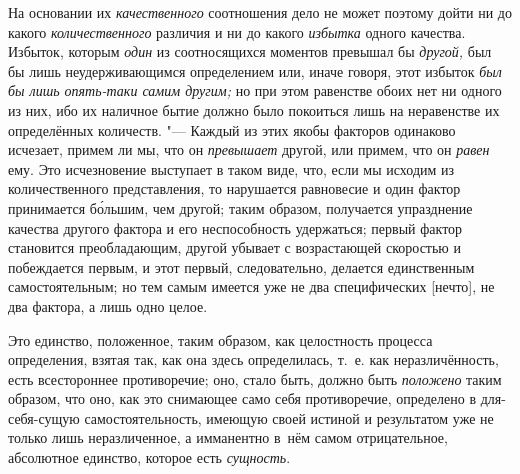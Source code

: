 На основании их {\em качественного} соотношения дело не может поэтому дойти ни
до какого {\em количественного} различия и ни до какого {\em избытка} одного
качества. Избыток, которым {\em один} из соотносящихся моментов превышал бы
{\em другой,} был бы лишь неудерживающимся определением или, иначе говоря, этот
избыток {\em был бы лишь опять-таки самим другим;} но при этом равенстве обоих
нет ни одного из них, ибо их наличное бытие должно было покоиться лишь на
неравенстве их определённых количеств. "--- Каждый из этих якобы факторов
одинаково исчезает, примем ли мы, что он {\em превышает} другой, или примем,
что он {\em равен} ему. Это исчезновение выступает в таком виде, что, если мы
исходим из количественного представления, то нарушается равновесие и один
фактор принимается б\'{о}льшим, чем другой; таким образом, получается
упразднение качества другого фактора и его неспособность удержаться; первый
фактор становится преобладающим, другой убывает с возрастающей скоростью и
побеждается первым, и этот первый, следовательно, делается единственным
самостоятельным; но тем самым имеется уже не два специфических [нечто], не два
фактора, а лишь одно целое.

Это единство, положенное, таким образом, как целостность процесса определения,
взятая так, как она здесь определилась, т.~е. как неразличённость, есть
всестороннее противоречие; оно, стало быть, должно быть {\em положено} таким
образом, что оно, как это снимающее само себя противоречие, определено в
для-себя-сущую самостоятельность, имеющую своей истиной и результатом уже не
только лишь неразличенное, а имманентно в~нём самом отрицательное, абсолютное
единство, которое есть {\em сущность}.


